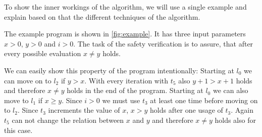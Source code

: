 

To show the inner workings of the algorithm, we will use a single example and explain based on that the different techniques of the algorithm.

The example program is shown in \ref{fig:example}.
It has three input parameters $x>0$, $y>0$ and $i>0$.
The task of the safety verification is to assure, that after every possible evaluation $x \neq y$ holds.

We can easily show this property of the program intentionally:
Starting at $l_0$ we can move on to $l_2$ if $y>x$.
With every iteration with $t_5$ also $y+1>x+1$ holds and therefore $x \neq y$ holds in the end of the program.
Starting at $l_0$ we can also move to $l_1$ if $x \geq y$.
Since $i>0$ we must use $t_3$ at least one time before moving on to $l_2$.
Since $t_3$ increments the value of $x$, $x > y$ holds after one usage of $t_3$.
Again $t_5$ can not change the relation between $x$ and $y$ and therefore $x \neq y$ holds also for this case.
